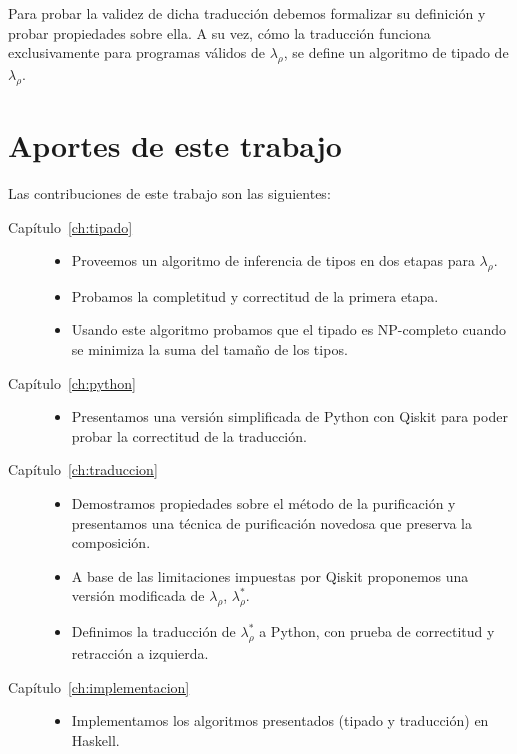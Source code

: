 Para probar la validez de dicha traducción debemos formalizar su definición y probar propiedades sobre ella. A su vez, cómo la traducción funciona exclusivamente para programas válidos de $\lambda_\rho$, se define un algoritmo de tipado de $\lambda_\rho$.

\section*{Aportes de este trabajo}
Las contribuciones de este trabajo son las siguientes:
\begin{description}
\item[Capítulo~\ref{ch:tipado}] 

    \begin{itemize}
        \item Proveemos un algoritmo de inferencia de tipos en dos etapas para $\lambda_\rho$.
        \item Probamos la completitud y correctitud de la primera etapa.
        \item Usando este algoritmo probamos que el tipado es NP-completo cuando se minimiza la suma del tamaño de los tipos.
    \end{itemize}
\item[Capítulo~\ref{ch:python}] 

    \begin{itemize}
        \item Presentamos una versión simplificada de Python con Qiskit para poder probar la correctitud de la traducción.
    \end{itemize}
\item[Capítulo~\ref{ch:traduccion}] 

    \begin{itemize}
        \item Demostramos propiedades sobre el método de la purificación y presentamos una técnica de purificación novedosa que preserva la composición.
        \item A base de las limitaciones impuestas por Qiskit proponemos una versión modificada de $\lambda_\rho$, $\lambda_\rho^*$.
        \item Definimos la traducción de $\lambda_\rho^*$ a Python, con prueba de correctitud y retracción a izquierda.
    \end{itemize}    
\item[Capítulo~\ref{ch:implementacion}] 

    \begin{itemize}
        \item Implementamos los algoritmos presentados (tipado y traducción) en Haskell.
    \end{itemize}    
\end{description}

